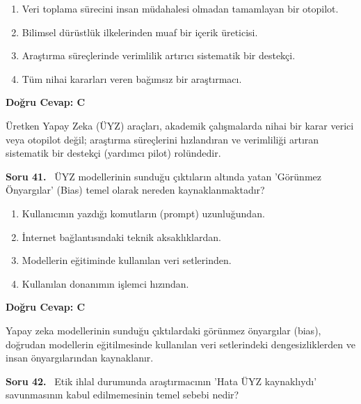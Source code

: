 \documentclass[11pt,a4paper,openany]{book}
\begin{document}
\begin{enumerate}[label=\Alph*), leftmargin=25pt, topsep=4pt, itemsep=2pt]
        \item Veri toplama sürecini insan müdahalesi olmadan tamamlayan bir otopilot.
        \item Bilimsel dürüstlük ilkelerinden muaf bir içerik üreticisi.
        \item Araştırma süreçlerinde verimlilik artırıcı sistematik bir destekçi.
        \item Tüm nihai kararları veren bağımsız bir araştırmacı.
\end{enumerate}

\vspace{4pt}
\begin{tcolorbox}[title=Cevap ve Açıklama, colback=gray!3!white, colframe=primarycolor!90!black, arc=2mm, fonttitle=\bfseries\sffamily, top=6pt, bottom=6pt]
    \textbf{Doğru Cevap: C}

    \vspace{2pt}
    Üretken Yapay Zeka (ÜYZ) araçları, akademik çalışmalarda nihai bir karar verici veya otopilot değil; araştırma süreçlerini hızlandıran ve verimliliği artıran sistematik bir destekçi (yardımcı pilot) rolündedir.
\end{tcolorbox}
\vspace{10pt}
\needspace{5cm}
\vspace{8pt}
\noindent\textbf{\large\sffamily Soru 41.} \ ÜYZ modellerinin sunduğu çıktıların altında yatan 'Görünmez Önyargılar' (Bias) temel olarak nereden kaynaklanmaktadır?

\begin{enumerate}[label=\Alph*), leftmargin=25pt, topsep=4pt, itemsep=2pt]
        \item Kullanıcının yazdığı komutların (prompt) uzunluğundan.
        \item İnternet bağlantısındaki teknik aksaklıklardan.
        \item Modellerin eğitiminde kullanılan veri setlerinden.
        \item Kullanılan donanımın işlemci hızından.
\end{enumerate}

\vspace{4pt}
\begin{tcolorbox}[title=Cevap ve Açıklama, colback=gray!3!white, colframe=primarycolor!90!black, arc=2mm, fonttitle=\bfseries\sffamily, top=6pt, bottom=6pt]
    \textbf{Doğru Cevap: C}

    \vspace{2pt}
    Yapay zeka modellerinin sunduğu çıktılardaki görünmez önyargılar (bias), doğrudan modellerin eğitilmesinde kullanılan veri setlerindeki dengesizliklerden ve insan önyargılarından kaynaklanır.
\end{tcolorbox}
\vspace{10pt}
\needspace{5cm}
\vspace{8pt}
\noindent\textbf{\large\sffamily Soru 42.} \ Etik ihlal durumunda araştırmacının 'Hata ÜYZ kaynaklıydı' savunmasının kabul edilmemesinin temel sebebi nedir?
\end{document}
